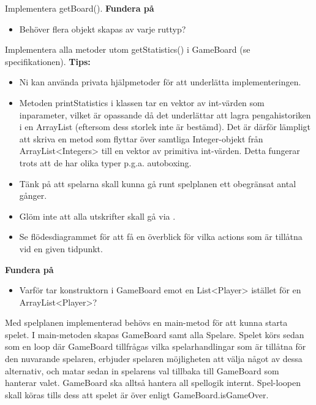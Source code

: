 \Subtask Implementera getBoard().
\newline
\newline
\textbf{Fundera på}
\begin{itemize}
\item Behöver flera objekt skapas av varje ruttyp?
\end{itemize}

\Task Implementera alla metoder utom getStatistics() i GameBoard (se specifikationen).
\newline
\newline
\textbf{Tips:}

\begin{itemize}
\item Ni kan använda privata hjälpmetoder för att underlätta implementeringen.
\item Metoden printStatistics i klassen  tar en vektor av int-värden som inparameter, vilket är opassande då det underlättar att lagra pengahistoriken i en ArrayList (eftersom dess storlek inte är bestämd). Det är därför lämpligt att skriva en metod som flyttar över samtliga Integer-objekt från ArrayList<Integers> till en vektor av primitiva int-värden. Detta fungerar trots att de har olika typer p.g.a. autoboxing. 
\item Tänk på att spelarna skall kunna gå runt spelplanen ett obegränsat antal gånger.
\item Glöm inte att alla utskrifter skall gå via  .
\item Se flödesdiagrammet för att få en överblick för vilka actions som är tillåtna vid en given tidpunkt.
\end{itemize}

\textbf{Fundera på}
\begin{itemize}
\item Varför tar konstruktorn i GameBoard emot en List<Player> istället för en ArrayList<Player>?
\end{itemize}

\Task Med spelplanen implementerad behövs en main-metod för att kunna starta spelet. I main-metoden skapas GameBoard samt alla Spelare. Spelet körs sedan som en loop där GameBoard tillfrågas vilka spelarhandlingar som är tillåtna för den nuvarande spelaren, erbjuder spelaren möjligheten att välja något av dessa alternativ, och matar sedan in spelarens val tillbaka till GameBoard som hanterar valet. GameBoard ska alltså hantera all spellogik internt.  Spel-loopen skall köras tills dess att spelet är över enligt GameBoard.isGameOver.

